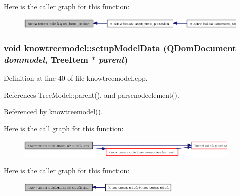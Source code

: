 Here is the caller graph for this function:\begin{figure}[H]
\begin{center}
\leavevmode
\includegraphics[width=371pt]{classknowtreemodel_6e9e460ebb16f09d1015fcc69ea943e9_icgraph}
\end{center}
\end{figure}
\subsubsection{\setlength{\rightskip}{0pt plus 5cm}void knowtreemodel::setup\-Model\-Data (QDom\-Document {\em dommodel}, {\bf Tree\-Item} $\ast$ {\em parent})\hspace{0.3cm}{\tt  [private]}}\label{classknowtreemodel_f68a64ca103c6f21899c87cf3392d011}




Definition at line 40 of file knowtreemodel.cpp.

References Tree\-Model::parent(), and parsenodeelement().

Referenced by knowtreemodel().

Here is the call graph for this function:\begin{figure}[H]
\begin{center}
\leavevmode
\includegraphics[width=305pt]{classknowtreemodel_f68a64ca103c6f21899c87cf3392d011_cgraph}
\end{center}
\end{figure}


Here is the caller graph for this function:\begin{figure}[H]
\begin{center}
\leavevmode
\includegraphics[width=223pt]{classknowtreemodel_f68a64ca103c6f21899c87cf3392d011_icgraph}
\end{center}
\end{figure}
